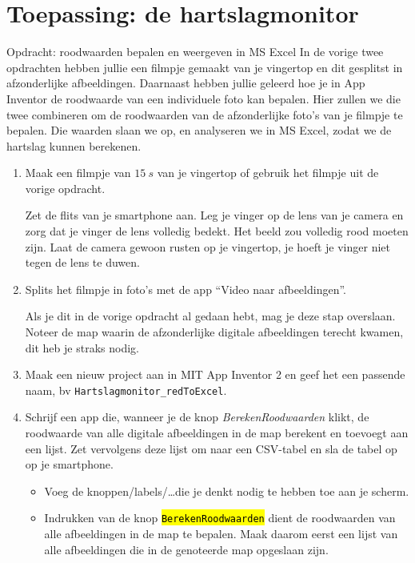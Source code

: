 \section{Toepassing: de hartslagmonitor}
\label{sec:Mod3_Sec3}
%

\begin{opdracht}{Opdracht: roodwaarden bepalen en weergeven in MS Excel}
	In de vorige twee opdrachten hebben jullie een filmpje gemaakt van je vingertop en dit gesplitst in afzonderlijke afbeeldingen. Daarnaast hebben jullie geleerd hoe je in App Inventor de roodwaarde van een individuele foto kan bepalen. Hier zullen we die twee combineren om de roodwaarden van de afzonderlijke foto's van je filmpje te bepalen. Die waarden slaan we op, en analyseren we in MS Excel, zodat we de hartslag kunnen berekenen.
	
\begin{enumerate}
	
	\item Maak een filmpje van $15~s$ van je vingertop of gebruik het filmpje uit de vorige opdracht.
	
	Zet de flits van je smartphone aan. Leg je vinger op de lens van je camera en zorg dat je vinger de lens volledig bedekt. Het beeld zou volledig rood moeten zijn. Laat de camera gewoon rusten op je vingertop, je hoeft je vinger niet tegen de lens te duwen.
	
	\item Splits het filmpje in foto's met de app \textquotedblleft Video naar afbeeldingen\textquotedblright.
	
	Als je dit in de vorige opdracht al gedaan hebt, mag je deze stap overslaan. Noteer de map waarin de afzonderlijke digitale afbeeldingen terecht kwamen, dit heb je straks nodig.
	
	\item Maak een nieuw project aan in MIT App Inventor 2 en geef het een passende naam, bv \texttt{Hartslagmonitor\_redToExcel}. 
	
	\item Schrijf een app die, wanneer je de knop \emph{BerekenRoodwaarden} klikt, de roodwaarde van alle digitale afbeeldingen in de map berekent en toevoegt aan een lijst. Zet vervolgens deze lijst om naar een CSV-tabel en sla de tabel op op je smartphone.

	
		\begin{itemize}
			\item Voeg de knoppen/labels/\ldots die je denkt nodig te hebben toe aan je scherm.
			\item Indrukken van de knop \hl{\texttt{BerekenRoodwaarden}} dient de roodwaarden van alle afbeeldingen in de map te bepalen. Maak daarom eerst een lijst van alle afbeeldingen die in de genoteerde map opgeslaan zijn. 
			

\end{itemize}
\end{enumerate}
\end{opdracht}
